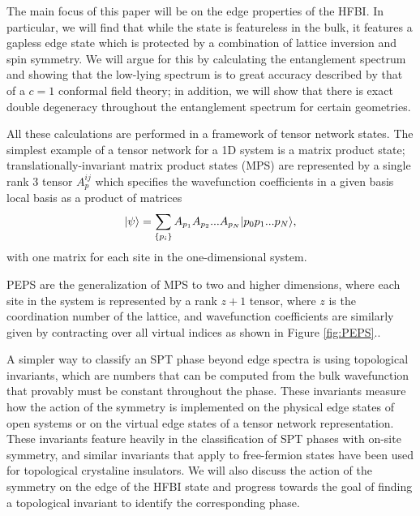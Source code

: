 The main focus of this paper will be on the edge properties of the HFBI.
In particular, we will find that while the state is featureless in the bulk, it
features a gapless edge state which is protected by a combination of lattice inversion
and spin symmetry. We will argue for this by calculating the entanglement spectrum and showing
that the low-lying spectrum is to great accuracy described by that of a $c=1$
conformal field theory; in addition, we will show that there is exact double 
degeneracy throughout the entanglement spectrum for certain geometries.

All these calculations are performed in a framework of tensor network states.
The simplest example of a tensor network for a 1D system is a matrix
product state; translationally-invariant matrix product states (MPS)
are represented by a single rank 3 tensor $A_p^{ij}$ which specifies
the wavefunction coefficients in a given basis local basis as a
product of matrices $$\vert \psi \rangle = \sum\limits_{\{p_i\}} A_{p_1}
A_{p_2} ... A_{p_N} \vert p_0 p_1 ... p_N \rangle,$$ with one matrix for each
site in the one-dimensional system.

PEPS are the generalization of MPS to two and higher dimensions, where
each site in the system is represented by a rank $z+1$ tensor, where
$z$ is the coordination number of the lattice, and wavefunction
coefficients are similarly given by contracting over all virtual
indices as shown in Figure \ref{fig:PEPS}.\cite{verstraete2004}.

A simpler way to classify an SPT phase beyond edge spectra is using 
topological invariants, which are numbers that can be computed from the bulk 
wavefunction that provably must be constant throughout the phase. These 
invariants measure how the action of the symmetry is implemented on the 
physical edge states of open systems or on the virtual edge states of a tensor 
network representation. These invariants feature heavily in the classification 
of SPT phases with on-site symmetry, and similar invariants that apply to 
free-fermion states have been used for topological crystaline insulators.
We will also discuss the action of the symmetry on the edge of the HFBI state 
and progress towards the goal of finding a topological invariant to identify 
the corresponding phase.